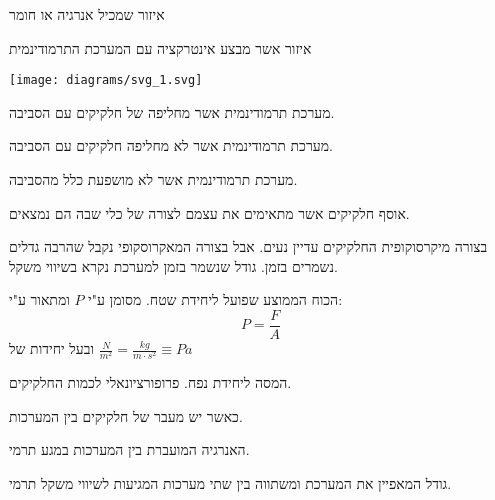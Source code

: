 \documentclass{tstextbook}
\begin{document}
\begin{definition}
איזור שמכיל אנרגיה או חומר 

\end{definition}
\begin{definition}[סביבה]
איזור אשר מבצע אינטרקציה עם המערכת התרמודינמית

\texttt{[image: diagrams/svg\_1.svg]}
\end{definition}
\begin{definition}
מערכת תרמודינמית אשר מחליפה של חלקיקים עם הסביבה.

\end{definition}
\begin{definition}
מערכת תרמודינמית אשר לא מחליפה חלקיקים עם הסביבה.

\end{definition}
\begin{definition}
מערכת תרמודינמית אשר לא מושפעת כלל מהסביבה.

\end{definition}
\begin{definition}[גז]
אוסף חלקיקים אשר מתאימים את עצמם לצורה של כלי שבה הם נמצאים.

\end{definition}
\begin{definition}
בצורה מיקרסוקופית החלקיקים עדיין נעים. אבל בצורה המאקרוסקופי נקבל שהרבה גדלים נשמרים בזמן. גודל שנשמר בזמן למערכת נקרא בשיווי משקל.

\end{definition}
\begin{definition}[לחץ]
הכוח הממוצע שפועל ליחידת שטח. מסומן ע"י \(P\) ומתאור ע"י:
$$P= \frac{F}{A}$$
ובעל יחידות של \(\frac{N}{m^2}=\frac{kg}{m\cdot s^2}\equiv Pa\)

\end{definition}
\begin{definition}[צפיפות]
המסה ליחידת נפח. פרופורציונאלי לכמות החלקיקים.

\end{definition}
\begin{definition}
כאשר יש מעבר של חלקיקים בין המערכות.

\end{definition}
\begin{definition}[חום]
האנרגיה המועברת בין המערכות במגע תרמי.

\end{definition}
\begin{definition}
גודל המאפיין את המערכת ומשתווה בין שתי מערכות המגיעות לשיווי משקל תרמי.

\end{definition}
\end{document}
